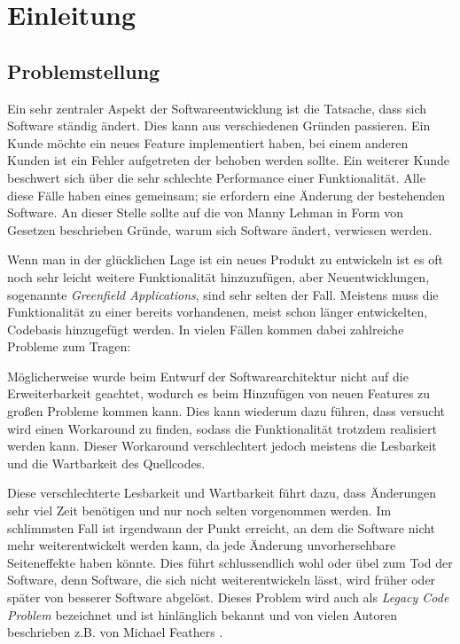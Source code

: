 \chapter{Einleitung}
\label{cha:Einleitung}

\section{Problemstellung}
\label{cha:Problemstellung}
Ein sehr zentraler Aspekt der Softwareentwicklung ist die Tatsache, dass sich Software ständig ändert. Dies kann aus verschiedenen Gründen passieren. Ein Kunde möchte ein neues Feature implementiert haben, bei einem anderen Kunden ist ein Fehler aufgetreten der behoben werden sollte. Ein weiterer Kunde beschwert sich über die sehr schlechte Performance einer Funktionalität. Alle diese Fälle haben eines gemeinsam; sie erfordern eine Änderung der bestehenden Software. An dieser Stelle sollte auf die von Manny Lehman \cite{Lehman1980} in Form von Gesetzen beschrieben Gründe, warum sich Software ändert, verwiesen werden.

Wenn man in der glücklichen Lage ist ein neues Produkt zu entwickeln ist es oft noch sehr leicht weitere Funktionalität hinzuzufügen, aber Neuentwicklungen, sogenannte \textit{Greenfield Applications}, sind sehr selten der Fall. Meistens muss die Funktionalität zu einer bereits vorhandenen, meist schon länger entwickelten, Codebasis hinzugefügt werden. In vielen Fällen kommen dabei zahlreiche Probleme zum Tragen: 

Möglicherweise wurde beim Entwurf der Softwarearchitektur nicht auf die Erweiterbarkeit geachtet, wodurch es beim Hinzufügen von neuen Features zu großen Probleme kommen kann. Dies kann wiederum dazu führen, dass versucht wird einen Workaround zu finden, sodass die Funktionalität trotzdem realisiert werden kann. Dieser Workaround verschlechtert jedoch meistens die Lesbarkeit und die Wartbarkeit des Quellcodes.

Diese verschlechterte Lesbarkeit und Wartbarkeit führt dazu, dass Änderungen sehr viel Zeit benötigen und nur noch selten vorgenommen werden. Im schlimmsten Fall ist irgendwann der Punkt erreicht, an dem die Software nicht mehr weiterentwickelt werden kann, da jede Änderung unvorhersehbare Seiteneffekte haben könnte. Dies führt schlussendlich wohl oder übel zum Tod der Software, denn Software, die sich nicht weiterentwickeln lässt, wird früher oder später von besserer Software abgelöst. Dieses Problem wird auch als \textit{Legacy Code Problem} bezeichnet und ist hinlänglich bekannt und von vielen Autoren beschrieben z.B. von Michael Feathers \cite{Feathers2013}.

